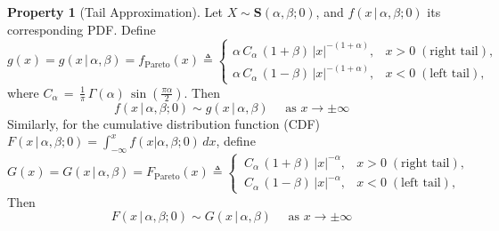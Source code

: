\documentclass{article}
\theoremstyle{definition}
\newtheorem{property}[definition]{Property}
\begin{document}
\begin{property}[Tail Approximation]\label{pr:tail-approximation}
Let \(X\sim\mathbf{S}(\alpha,\beta;0)\), and \(f(x\,|\,\alpha,\beta;0)\) its corresponding PDF. Define
\begin{equation}
g(x)=g(x\,|\,\alpha,\beta)
=f_\mathrm{Pareto}(x)\triangleq 
\begin{cases}
\displaystyle
\alpha\,C_\alpha\,(1+\beta)\,\lvert x\rvert^{-(1+\alpha)},
& x>0\;(\text{right tail}),\\[8pt]
\displaystyle
\alpha\,C_\alpha\,(1-\beta)\,\lvert x\rvert^{-(1+\alpha)},
& x<0\;(\text{left tail}),
\end{cases}
\end{equation}
where \(C_\alpha \,=\,\frac{1}{\pi}\,
\Gamma(\alpha)\,\sin{(\tfrac{\pi\alpha}{2})}\).
Then 
\[
f(x\,|\,\alpha,\beta;0)\sim g(x\,|\,\alpha,\beta)\quad\text{ as }x\to\pm\infty
\]
Similarly, for the cumulative distribution function (CDF) \(F(x\,|\,\alpha,\beta;0)=\int_{-\infty}^xf(x|\alpha,\beta;0)\,dx\), define
\begin{equation}
G(x)=G(x\,|\,\alpha,\beta)
=F_\mathrm{Pareto}(x)\triangleq 
\begin{cases}
\displaystyle
\,C_\alpha\,(1+\beta)\,\lvert x\rvert^{-\alpha},
& x>0\;(\text{right tail}),\\[8pt]
\displaystyle
\,C_\alpha\,(1-\beta)\,\lvert x\rvert^{-\alpha},
& x<0\;(\text{left tail}),
\end{cases}
\end{equation}
 Then 
\[
F(x\,|\,\alpha,\beta;0)\sim G(x\,|\,\alpha,\beta)\quad\text{ as }x\to\pm\infty
\]
\end{property}
\end{document}
